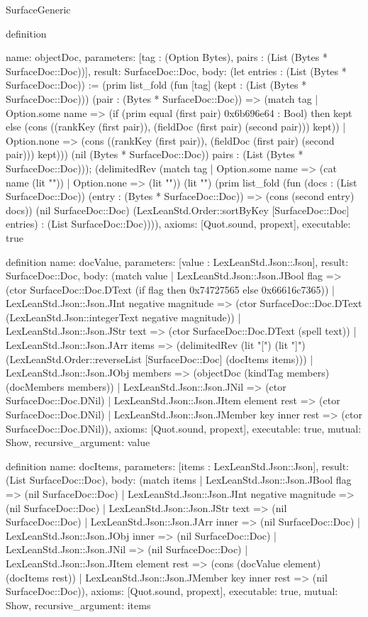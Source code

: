 \begin{lexlean}{SurfaceGeneric}
\begin{semanticmodule}
definition{
  name: objectDoc,
  parameters: [tag : (Option Bytes), pairs : (List (Bytes * SurfaceDoc::Doc))],
  result: SurfaceDoc::Doc,
  body: (let entries : (List (Bytes * SurfaceDoc::Doc)) := (prim list_fold (fun [tag] (kept : (List (Bytes * SurfaceDoc::Doc))) (pair : (Bytes * SurfaceDoc::Doc)) => (match tag
    | Option.some name => (if (prim equal (first pair) 0x6b696e64 : Bool) then kept else (cons ((rankKey (first pair)), (fieldDoc (first pair) (second pair))) kept))
    | Option.none => (cons ((rankKey (first pair)), (fieldDoc (first pair) (second pair))) kept))) (nil (Bytes * SurfaceDoc::Doc)) pairs : (List (Bytes * SurfaceDoc::Doc))); (delimitedRev (match tag
    | Option.some name => (cat name (lit "{"))
    | Option.none => (lit "{")) (lit "}") (prim list_fold (fun (docs : (List SurfaceDoc::Doc)) (entry : (Bytes * SurfaceDoc::Doc)) => (cons (second entry) docs)) (nil SurfaceDoc::Doc) (LexLeanStd.Order::sortByKey [SurfaceDoc::Doc] entries) : (List SurfaceDoc::Doc)))),
  axioms: [Quot.sound, propext],
  executable: true
}

definition{
  name: docValue,
  parameters: [value : LexLeanStd.Json::Json],
  result: SurfaceDoc::Doc,
  body: (match value
    | LexLeanStd.Json::Json.JBool flag => (ctor SurfaceDoc::Doc.DText (if flag then 0x74727565 else 0x66616c7365))
    | LexLeanStd.Json::Json.JInt negative magnitude => (ctor SurfaceDoc::Doc.DText (LexLeanStd.Json::integerText negative magnitude))
    | LexLeanStd.Json::Json.JStr text => (ctor SurfaceDoc::Doc.DText (spell text))
    | LexLeanStd.Json::Json.JArr items => (delimitedRev (lit "[") (lit "]") (LexLeanStd.Order::reverseList [SurfaceDoc::Doc] (docItems items)))
    | LexLeanStd.Json::Json.JObj members => (objectDoc (kindTag members) (docMembers members))
    | LexLeanStd.Json::Json.JNil => (ctor SurfaceDoc::Doc.DNil)
    | LexLeanStd.Json::Json.JItem element rest => (ctor SurfaceDoc::Doc.DNil)
    | LexLeanStd.Json::Json.JMember key inner rest => (ctor SurfaceDoc::Doc.DNil)),
  axioms: [Quot.sound, propext],
  executable: true,
  mutual: Show,
  recursive_argument: value
}

definition{
  name: docItems,
  parameters: [items : LexLeanStd.Json::Json],
  result: (List SurfaceDoc::Doc),
  body: (match items
    | LexLeanStd.Json::Json.JBool flag => (nil SurfaceDoc::Doc)
    | LexLeanStd.Json::Json.JInt negative magnitude => (nil SurfaceDoc::Doc)
    | LexLeanStd.Json::Json.JStr text => (nil SurfaceDoc::Doc)
    | LexLeanStd.Json::Json.JArr inner => (nil SurfaceDoc::Doc)
    | LexLeanStd.Json::Json.JObj inner => (nil SurfaceDoc::Doc)
    | LexLeanStd.Json::Json.JNil => (nil SurfaceDoc::Doc)
    | LexLeanStd.Json::Json.JItem element rest => (cons (docValue element) (docItems rest))
    | LexLeanStd.Json::Json.JMember key inner rest => (nil SurfaceDoc::Doc)),
  axioms: [Quot.sound, propext],
  executable: true,
  mutual: Show,
  recursive_argument: items
}

}
\end{semanticmodule}
\end{lexlean}
